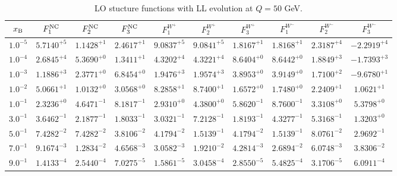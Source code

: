 \begin{table}[h]
\begin{adjustbox}{width=\textwidth}
\begin{tabular}{|c||c|c|c|c|c|c|c|c|c|}
\hline
$x_{\rm B}$ & $F_1^{\rm NC}$ & $F_2^{\rm NC}$ & $F_3^{\rm NC}$ & $F_1^{W^+}$ & $F_2^{W^+}$ & $F_3^{W^+}$ & $F_1^{W^-}$ & $F_2^{W^-}$ & $F_3^{W^-}$ \\
\hline
$ 1.0^{-5}$ & $ 5.7140^{+5}$ & $ 1.1428^{+1}$ & $ 2.4617^{+1}$ & $ 9.0837^{+5}$ & $ 9.0841^{+5}$ & $ 1.8167^{+1}$ & $ 1.8168^{+1}$ & $ 2.3187^{+4}$ & $-2.2919^{+4}$ \\
$ 1.0^{-4}$ & $ 2.6845^{+4}$ & $ 5.3690^{+0}$ & $ 1.3411^{+1}$ & $ 4.3202^{+4}$ & $ 4.3221^{+4}$ & $ 8.6404^{+0}$ & $ 8.6442^{+0}$ & $ 1.8849^{+3}$ & $-1.7393^{+3}$ \\
$ 1.0^{-3}$ & $ 1.1886^{+3}$ & $ 2.3771^{+0}$ & $ 6.8454^{+0}$ & $ 1.9476^{+3}$ & $ 1.9574^{+3}$ & $ 3.8953^{+0}$ & $ 3.9149^{+0}$ & $ 1.7100^{+2}$ & $-9.6780^{+1}$ \\
$ 1.0^{-2}$ & $ 5.0661^{+1}$ & $ 1.0132^{+0}$ & $ 3.0568^{+0}$ & $ 8.2858^{+1}$ & $ 8.7400^{+1}$ & $ 1.6572^{+0}$ & $ 1.7480^{+0}$ & $ 2.2409^{+1}$ & $ 1.0621^{+1}$ \\
$ 1.0^{-1}$ & $ 2.3236^{+0}$ & $ 4.6471^{-1}$ & $ 8.1817^{-1}$ & $ 2.9310^{+0}$ & $ 4.3800^{+0}$ & $ 5.8620^{-1}$ & $ 8.7600^{-1}$ & $ 3.3108^{+0}$ & $ 5.3798^{+0}$ \\
$ 3.0^{-1}$ & $ 3.6462^{-1}$ & $ 2.1877^{-1}$ & $ 1.8033^{-1}$ & $ 3.0321^{-1}$ & $ 7.2128^{-1}$ & $ 1.8193^{-1}$ & $ 4.3277^{-1}$ & $ 5.3168^{-1}$ & $ 1.3203^{+0}$ \\
$ 5.0^{-1}$ & $ 7.4282^{-2}$ & $ 7.4282^{-2}$ & $ 3.8106^{-2}$ & $ 4.1794^{-2}$ & $ 1.5139^{-1}$ & $ 4.1794^{-2}$ & $ 1.5139^{-1}$ & $ 8.0761^{-2}$ & $ 2.9692^{-1}$ \\
$ 7.0^{-1}$ & $ 9.1674^{-3}$ & $ 1.2834^{-2}$ & $ 4.6568^{-3}$ & $ 3.0582^{-3}$ & $ 1.9210^{-2}$ & $ 4.2814^{-3}$ & $ 2.6894^{-2}$ & $ 6.0748^{-3}$ & $ 3.8306^{-2}$ \\
$ 9.0^{-1}$ & $ 1.4133^{-4}$ & $ 2.5440^{-4}$ & $ 7.0275^{-5}$ & $ 1.5861^{-5}$ & $ 3.0458^{-4}$ & $ 2.8550^{-5}$ & $ 5.4825^{-4}$ & $ 3.1706^{-5}$ & $ 6.0911^{-4}$ \\
\hline
\end{tabular}
\end{adjustbox}\caption{LO stucture functions with LL evolution at $Q = 50$ GeV.}
\label{tab:N0LO-Q50}
\end{table}


